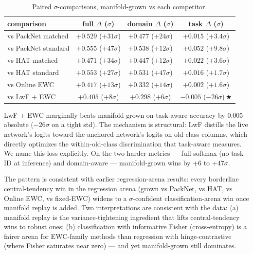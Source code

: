 \documentclass[11pt]{article}
\newcommand{\headline}{$\bigstar$}
\begin{document}
\begin{table}[h]
  \centering
  \caption{Paired $\sigma$-comparisons, manifold-grown vs each competitor.}
  \label{tab:paired-sigma}
  \begin{tabular}{lccc}
    \toprule
    comparison              & full $\Delta$ ($\sigma$) & domain $\Delta$ ($\sigma$) & task $\Delta$ ($\sigma$) \\
    \midrule
    vs PackNet matched      & $+0.529$ ($+31\sigma$)   & $+0.477$ ($+24\sigma$)     & $+0.015$ ($+3.4\sigma$)  \\
    vs PackNet standard     & $+0.555$ ($+47\sigma$)   & $+0.538$ ($+12\sigma$)     & $+0.052$ ($+9.8\sigma$)  \\
    vs HAT matched          & $+0.471$ ($+34\sigma$)   & $+0.447$ ($+12\sigma$)     & $+0.022$ ($+3.6\sigma$)  \\
    vs HAT standard         & $+0.553$ ($+27\sigma$)   & $+0.531$ ($+47\sigma$)     & $+0.016$ ($+1.7\sigma$)  \\
    vs Online EWC           & $+0.417$ ($+13\sigma$)   & $+0.332$ ($+14\sigma$)     & $+0.002$ ($+1.6\sigma$)  \\
    vs LwF $+$ EWC          & $+0.405$ ($+8\sigma$)    & $+0.298$ ($+6\sigma$)      & $-0.005$ ($-26\sigma$)\,\headline \\
    \bottomrule
  \end{tabular}
\end{table}

LwF $+$ EWC marginally beats manifold-grown on task-aware accuracy by
$0.005$ absolute ($-26\sigma$ on a tight std). The mechanism is
structural: LwF distills the live network's logits toward the anchored
network's logits on old-class columns, which directly optimizes the
within-old-class discrimination that task-aware measures. We name this
loss explicitly. On the two harder metrics --- full-softmax (no task ID at
inference) and domain-aware --- manifold-grown wins by $+6$ to
$+47\sigma$.

The pattern is consistent with earlier regression-arena results: every
borderline central-tendency win in the regression arena (grown vs
PackNet, vs HAT, vs Online EWC, vs fixed-EWC) widens to a
$\sigma$-confident classification-arena win once manifold replay is
added. Two interpretations are consistent with the data: (a) manifold
replay is the variance-tightening ingredient that lifts central-tendency
wins to robust ones; (b) classification with informative Fisher
(cross-entropy) is a fairer arena for EWC-family methods than regression
with hinge-contrastive (where Fisher saturates near zero) --- and yet
manifold-grown still dominates.
\end{document}

